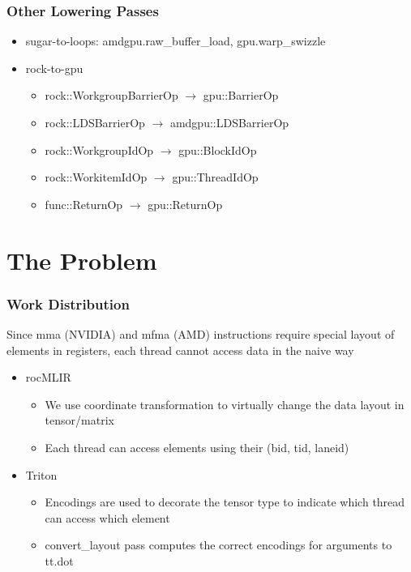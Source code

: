 \documentclass[t, pdftex, aspectratio=169]{beamer}  %
\begin{document}
\begin{frame}
  \frametitle{Other Lowering Passes}
  \begin{itemize}
  \item sugar-to-loops: amdgpu.raw\_buffer\_load, gpu.warp\_swizzle
  \item rock-to-gpu
    \begin{itemize}
      \item rock::WorkgroupBarrierOp $\rightarrow$  gpu::BarrierOp
      \item rock::LDSBarrierOp $\rightarrow$  amdgpu::LDSBarrierOp
      \item rock::WorkgroupIdOp $\rightarrow$  gpu::BlockIdOp
      \item rock::WorkitemIdOp $\rightarrow$  gpu::ThreadIdOp
      \item func::ReturnOp $\rightarrow$  gpu::ReturnOp
    \end{itemize}
  \end{itemize}
\end{frame}


\section{The Problem}

\begin{frame}
  \frametitle{Work Distribution}
  Since mma (NVIDIA) and mfma (AMD) instructions require special layout of elements in registers, each thread cannot access data in the naive way
  \begin{itemize}
  \item rocMLIR
    \begin{itemize}
    \item We use coordinate transformation to virtually change the data layout in tensor/matrix
    \item Each thread can access elements using their (bid, tid, laneid)
    \end{itemize}
  \item Triton
    \begin{itemize}
    \item Encodings are used to decorate the tensor type to indicate which thread can access which element
    \item convert\_layout pass computes the correct encodings for arguments to tt.dot
    \end{itemize}
  \end{itemize}
\end{frame}
	
\end{document}
